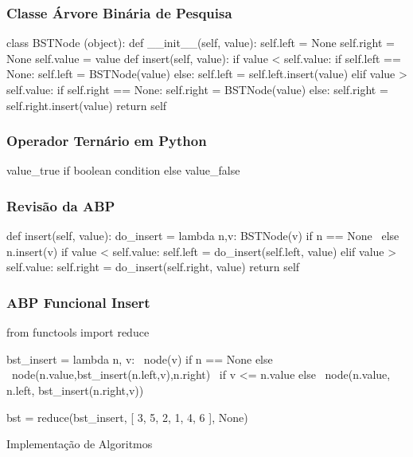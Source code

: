 \documentclass[aspectratio=169,14pt]{beamer}
\begin{document}
\begin{frame}[fragile]
    \frametitle{Classe Árvore Binária de Pesquisa}
    \begin{python}
class BSTNode (object):
    def __init__(self, value):
        self.left = None
        self.right = None
        self.value = value
    def insert(self, value):
        if value < self.value:
            if self.left == None: self.left = BSTNode(value)
            else: self.left = self.left.insert(value)
        elif value > self.value:
            if self.right == None: self.right = BSTNode(value)
            else: self.right = self.right.insert(value)
        return self
    \end{python}
\end{frame}
\begin{frame}
    \frametitle{Operador Ternário em Python}
    \begin{center}
        \normalsize\ttfamily
        value\_true {\color{green}if} boolean condition {\color{green}else} value\_false
    \end{center}
\end{frame}
\begin{frame}[fragile]
    \frametitle{Revisão da ABP}
    \begin{python}
    def insert(self, value):
        do_insert = lambda n,v: BSTNode(v) if n == None \
                                else n.insert(v)
        if value < self.value:
            self.left = do_insert(self.left, value)
        elif value > self.value:
            self.right = do_insert(self.right, value)
        return self
    \end{python}
\end{frame}
\begin{frame}[fragile]
    \frametitle{ABP Funcional Insert}
    \begin{python}
    from functools import reduce

    bst_insert = lambda n, v: \
            node(v) if n == None else \
              node(n.value,bst_insert(n.left,v),n.right) \
                if v <= n.value else \
                  node(n.value, n.left, bst_insert(n.right,v))

    bst = reduce(bst_insert, [ 3, 5, 2, 1, 4, 6 ], None)
    \end{python}
\end{frame}

\begin{frame}
    \begin{center}
        \Huge Implementação de Algoritmos
    \end{center}
\end{frame}
\end{document}
